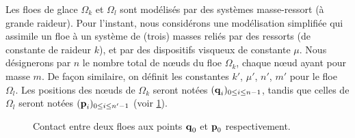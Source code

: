 Les floes de glace $\Omega_k$ et $\Omega_l$ sont modélisés par des systèmes masse-ressort (à grande raideur). Pour l'instant, nous considérons une modélisation simplifiée qui assimile un floe à un système de (trois) masses reliés par des ressorts (de constante de raideur $k$), et par des dispositifs visqueux de constante $\mu$.
Nous désignerons par $n$ le nombre total de n\oe{}uds du floe $\Omega_k$, chaque n\oe{}ud ayant pour masse $m$. De façon similaire, on définit les constantes $k'$, $\mu'$, $n'$, $m'$ pour le floe $\Omega_l$. Les positions des n\oe{}uds de $\Omega_k$ seront notées $(\bm{\mathrm{q}}_i)_{0\leq i\leq n-1}$, tandis que celles de $\Omega_l$ seront notées $(\bm{\mathrm{p}}_i)_{0 \leq i\leq n'-1}$ (voir \cref{fig:contactmanuel}). 

\begin{figure}[!h]
    \centering
    \caption{Contact entre deux floes aux points $\bm{\mathrm{q}}_0$ et $\bm{\mathrm{p}}_0$ respectivement.}
    \label{fig:contactmanuel}
\end{figure}

